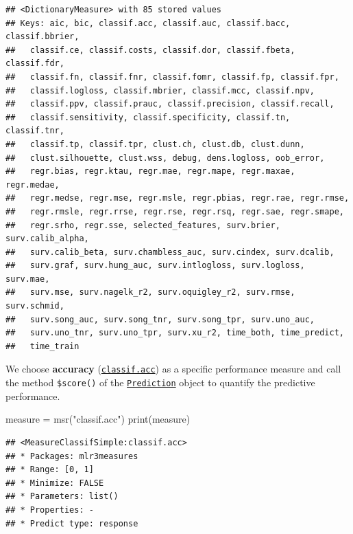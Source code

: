 \documentclass[
]{scrbook}
\newenvironment{Shaded}{\begin{snugshade}}{\end{snugshade}}
\newcommand{\FunctionTok}[1]{\textcolor[rgb]{0.00,0.00,0.00}{#1}}
\newcommand{\NormalTok}[1]{#1}
\newcommand{\OtherTok}[1]{\textcolor[rgb]{0.56,0.35,0.01}{#1}}
\newcommand{\SpecialCharTok}[1]{\textcolor[rgb]{0.00,0.00,0.00}{#1}}
\newcommand{\StringTok}[1]{\textcolor[rgb]{0.31,0.60,0.02}{#1}}
\renewenvironment{Shaded} {\begin{snugshade}\small} {\end{snugshade}}
\begin{document}
\begin{verbatim}
## <DictionaryMeasure> with 85 stored values
## Keys: aic, bic, classif.acc, classif.auc, classif.bacc, classif.bbrier,
##   classif.ce, classif.costs, classif.dor, classif.fbeta, classif.fdr,
##   classif.fn, classif.fnr, classif.fomr, classif.fp, classif.fpr,
##   classif.logloss, classif.mbrier, classif.mcc, classif.npv,
##   classif.ppv, classif.prauc, classif.precision, classif.recall,
##   classif.sensitivity, classif.specificity, classif.tn, classif.tnr,
##   classif.tp, classif.tpr, clust.ch, clust.db, clust.dunn,
##   clust.silhouette, clust.wss, debug, dens.logloss, oob_error,
##   regr.bias, regr.ktau, regr.mae, regr.mape, regr.maxae, regr.medae,
##   regr.medse, regr.mse, regr.msle, regr.pbias, regr.rae, regr.rmse,
##   regr.rmsle, regr.rrse, regr.rse, regr.rsq, regr.sae, regr.smape,
##   regr.srho, regr.sse, selected_features, surv.brier, surv.calib_alpha,
##   surv.calib_beta, surv.chambless_auc, surv.cindex, surv.dcalib,
##   surv.graf, surv.hung_auc, surv.intlogloss, surv.logloss, surv.mae,
##   surv.mse, surv.nagelk_r2, surv.oquigley_r2, surv.rmse, surv.schmid,
##   surv.song_auc, surv.song_tnr, surv.song_tpr, surv.uno_auc,
##   surv.uno_tnr, surv.uno_tpr, surv.xu_r2, time_both, time_predict,
##   time_train
\end{verbatim}

We choose \textbf{accuracy} (\href{https://mlr3.mlr-org.com/reference/mlr_measures_classif.acc.html}{\texttt{classif.acc}}) as a specific performance measure and call the method \texttt{\$score()} of the \href{https://mlr3.mlr-org.com/reference/Prediction.html}{\texttt{Prediction}} object to quantify the predictive performance.

\begin{Shaded}
\begin{Highlighting}[]
\NormalTok{measure }\OtherTok{=} \FunctionTok{msr}\NormalTok{(}\StringTok{"classif.acc"}\NormalTok{)}
\FunctionTok{print}\NormalTok{(measure)}
\end{Highlighting}
\end{Shaded}

\begin{verbatim}
## <MeasureClassifSimple:classif.acc>
## * Packages: mlr3measures
## * Range: [0, 1]
## * Minimize: FALSE
## * Parameters: list()
## * Properties: -
## * Predict type: response
\end{verbatim}

\begin{Shaded}
\end{Shaded}
\end{document}
